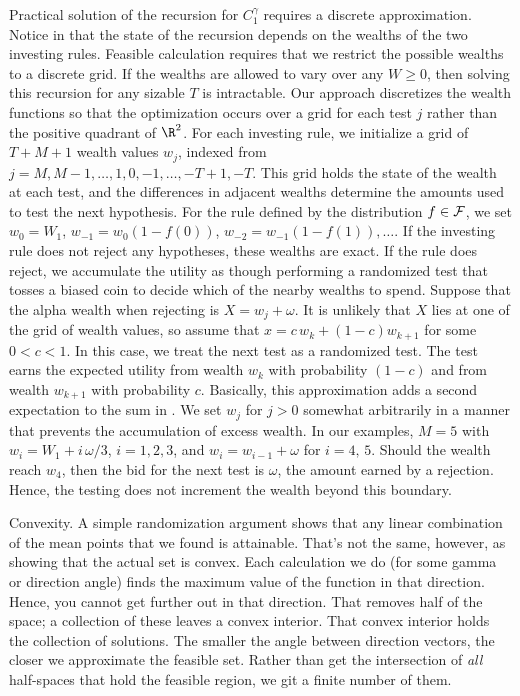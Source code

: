 \documentclass[12pt]{article}
\begin{document}
 Practical solution of the recursion for $C_1^\gamma$ requires a discrete
 approximation.  Notice in  that the state of the recursion depends
 on the wealths of the two investing rules. Feasible calculation requires that
 we restrict the possible wealths to a discrete grid.  If the wealths are
 allowed to vary over any $W \ge 0$, then solving this recursion for any sizable
 $T$ is intractable.  Our approach discretizes the wealth functions so that the
 optimization occurs over a grid for each test $j$ rather than the positive
 quadrant of $\R^2$.  For each investing rule, we initialize a grid of $T+M+1$
 wealth values $w_j$, indexed from $j=M, M-1, \ldots, 1, 0, -1, \ldots, -T+1,
 -T$.  This grid holds the state of the wealth at each test, and the differences
 in adjacent wealths determine the amounts used to test the next hypothesis.
  For the rule defined by the distribution $f \in {\cal F}$, we set $w_0 = W_1$,
 $w_{-1} = w_0(1-f(0))$, $w_{-2} = w_{-1}(1-f(1)), \ldots$.  If the investing
 rule does not reject any hypotheses, these wealths are exact.  If the rule does
 reject, we accumulate the utility as though performing a randomized test that
 tosses a biased coin to decide which of the nearby wealths to spend.  Suppose
 that the alpha wealth when rejecting is $X = w_j + \omega$.  It is unlikely
 that $X$ lies at one of the grid of wealth values, so assume that $x = c \, w_k
 + (1-c) w_{k+1}$ for some $0 < c < 1$.  In this case, we treat the next test as
 a randomized test.  The test earns the expected utility from wealth $w_k$ with
 probability $(1-c)$ and from wealth $w_{k+1}$ with probability $c$. Basically,
 this approximation adds a second expectation to the sum in . We
 set $w_j$ for $j > 0$ somewhat arbitrarily in a manner that prevents the
 accumulation of excess wealth.  In our examples, $M=5$ with $w_i = W_1 + i
 \,\omega/3$, $i=1,2,3$, and $w_i = w_{i-1} + \omega$ for $i=4,\,5$.  Should the
 wealth reach $w_4$, then the bid for the next test is $\omega$, the amount
 earned by a rejection.  Hence, the testing does not increment the wealth beyond
 this boundary.
 

 
 Convexity. A simple randomization argument shows that any linear combination of
 the mean points that we found is attainable.  That's not the same, however, as
 showing that the actual set is convex.  Each calculation we do (for some gamma
 or direction angle) finds the maximum value of the function in that direction.
  Hence, you cannot get further out in that direction. That removes half of the
 space; a collection of these leaves a convex interior.  That convex interior
 holds the collection of solutions.  The smaller the angle between direction
 vectors, the closer we approximate the feasible set.  Rather than get the
 intersection of {\em all} half-spaces that hold the feasible region, we git a
 finite number of them.
\end{document}
